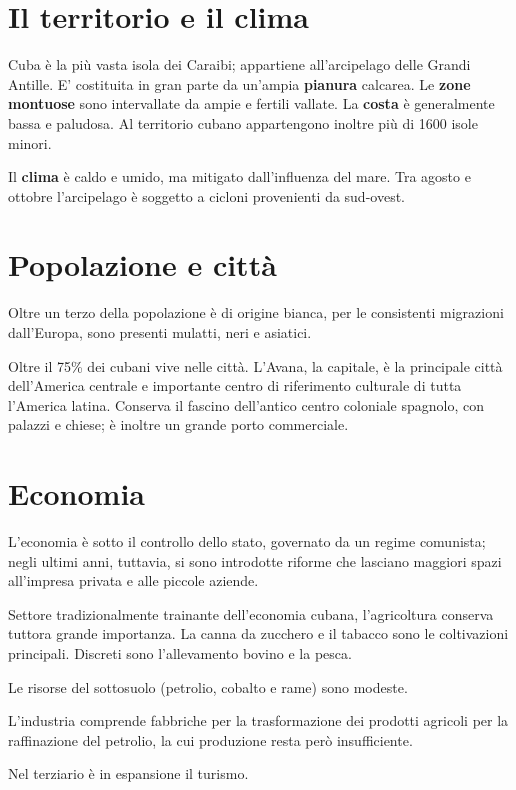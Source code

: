 \section{Il territorio e il clima}
Cuba è la più vasta isola dei Caraibi; appartiene all'arcipelago delle Grandi Antille. E' costituita in gran parte da un'ampia {\bf pianura} calcarea. Le {\bf zone montuose} sono intervallate da ampie e fertili vallate. La {\bf costa} è generalmente bassa e paludosa. Al territorio cubano appartengono inoltre più di 1600 isole minori.

Il {\bf clima} è caldo e umido, ma mitigato dall'influenza del mare. Tra agosto e ottobre l'arcipelago è soggetto a cicloni provenienti da sud-ovest.

\section{Popolazione e città}
Oltre un terzo della popolazione è di origine bianca, per le consistenti migrazioni dall'Europa, sono presenti mulatti, neri e asiatici.

Oltre il 75\% dei cubani vive nelle città. L'Avana, la capitale, è la principale città dell'America centrale e importante centro di riferimento culturale di tutta l'America latina. Conserva il fascino dell'antico centro coloniale spagnolo, con palazzi e chiese; è inoltre un grande porto commerciale.

\section{Economia}
L'economia è sotto il controllo dello stato, governato da un regime comunista; negli ultimi anni, tuttavia, si sono introdotte riforme che lasciano maggiori spazi all'impresa privata e alle piccole aziende.

Settore tradizionalmente trainante dell'economia cubana, l'agricoltura conserva tuttora grande importanza. La canna da zucchero e il tabacco sono le coltivazioni principali. Discreti sono l'allevamento bovino e la pesca.

Le risorse del sottosuolo (petrolio, cobalto e rame) sono modeste.

L'industria comprende fabbriche per la trasformazione dei prodotti agricoli per la raffinazione del petrolio, la cui produzione resta però insufficiente.

Nel terziario è in espansione il turismo.
